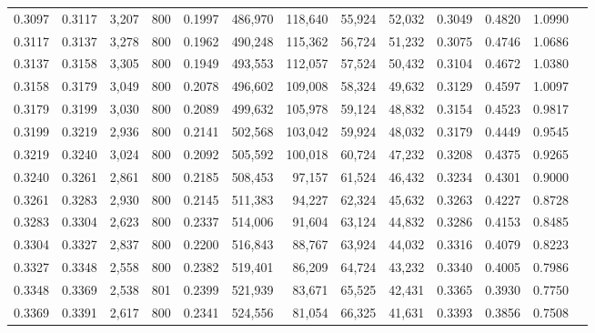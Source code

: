 \begin{tabular}{rrrrrrrrrrrrr}
0.3097 & 0.3117 &  3,207 &   800 &                                     0.1997 & 486,970 & 118,640 &  55,924 &  52,032 & 0.3049 & 0.4820 & 1.0990 \\
0.3117 & 0.3137 &  3,278 &   800 &                                     0.1962 & 490,248 & 115,362 &  56,724 &  51,232 & 0.3075 & 0.4746 & 1.0686 \\
0.3137 & 0.3158 &  3,305 &   800 &                                     0.1949 & 493,553 & 112,057 &  57,524 &  50,432 & 0.3104 & 0.4672 & 1.0380 \\
0.3158 & 0.3179 &  3,049 &   800 &                                     0.2078 & 496,602 & 109,008 &  58,324 &  49,632 & 0.3129 & 0.4597 & 1.0097 \\
0.3179 & 0.3199 &  3,030 &   800 &                                     0.2089 & 499,632 & 105,978 &  59,124 &  48,832 & 0.3154 & 0.4523 & 0.9817 \\
0.3199 & 0.3219 &  2,936 &   800 &                                     0.2141 & 502,568 & 103,042 &  59,924 &  48,032 & 0.3179 & 0.4449 & 0.9545 \\
0.3219 & 0.3240 &  3,024 &   800 &                                     0.2092 & 505,592 & 100,018 &  60,724 &  47,232 & 0.3208 & 0.4375 & 0.9265 \\
0.3240 & 0.3261 &  2,861 &   800 &                                     0.2185 & 508,453 &  97,157 &  61,524 &  46,432 & 0.3234 & 0.4301 & 0.9000 \\
0.3261 & 0.3283 &  2,930 &   800 &                                     0.2145 & 511,383 &  94,227 &  62,324 &  45,632 & 0.3263 & 0.4227 & 0.8728 \\
0.3283 & 0.3304 &  2,623 &   800 &                                     0.2337 & 514,006 &  91,604 &  63,124 &  44,832 & 0.3286 & 0.4153 & 0.8485 \\
0.3304 & 0.3327 &  2,837 &   800 &                                     0.2200 & 516,843 &  88,767 &  63,924 &  44,032 & 0.3316 & 0.4079 & 0.8223 \\
0.3327 & 0.3348 &  2,558 &   800 &                                     0.2382 & 519,401 &  86,209 &  64,724 &  43,232 & 0.3340 & 0.4005 & 0.7986 \\
0.3348 & 0.3369 &  2,538 &   801 &                                     0.2399 & 521,939 &  83,671 &  65,525 &  42,431 & 0.3365 & 0.3930 & 0.7750 \\
0.3369 & 0.3391 &  2,617 &   800 &                                     0.2341 & 524,556 &  81,054 &  66,325 &  41,631 & 0.3393 & 0.3856 & 0.7508 \\

\end{tabular}
